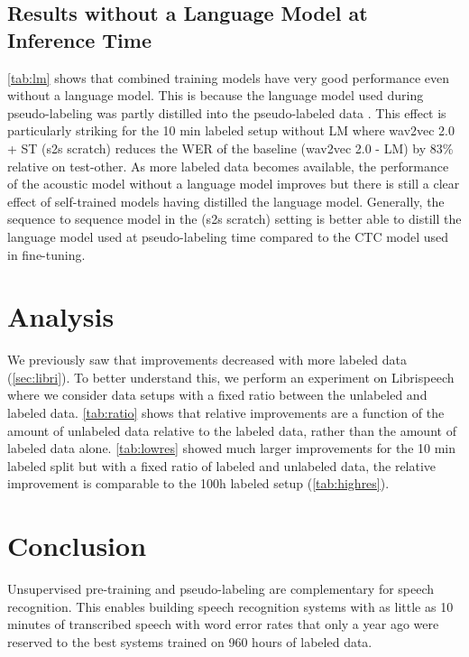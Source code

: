 \documentclass{article}
\newcommand{\wvpp}{wav2vec 2.0}
\newcommand{\libri}{Librispeech}
\begin{document}
\subsection{Results without a Language Model at Inference Time}

\autoref{tab:lm} shows that combined training models have very good performance even without a language model.
This is because the language model used during pseudo-labeling was partly distilled into the pseudo-labeled data \cite{synnaeve2019end}.
This effect is particularly striking for the 10 min labeled setup without LM where \wvpp{} + ST (s2s scratch) reduces the WER of the baseline (\wvpp{} - LM) by 83\% relative on test-other.
As more labeled data becomes available, the performance of the acoustic model without a language model improves but there is still a clear effect of self-trained models having distilled the language model.
Generally, the sequence to sequence model in the (s2s scratch) setting is better able to distill the language model used at pseudo-labeling time compared to the CTC model used in fine-tuning.





\section{Analysis}
\label{sec:analysis}


We previously saw that improvements decreased with more labeled data (\autoref{sec:libri}).
To better understand this, we perform an experiment on \libri{} where we consider data setups with a fixed ratio between the unlabeled and labeled data.
\autoref{tab:ratio} shows that relative improvements are a function of the amount of unlabeled data relative to the labeled data, rather than the amount of labeled data alone.
\autoref{tab:lowres} showed much larger improvements for the 10 min labeled split but with a fixed ratio of labeled and unlabeled data, the relative improvement is comparable to the 100h labeled setup (\autoref{tab:highres}).





\section{Conclusion}

Unsupervised pre-training and pseudo-labeling are complementary for speech recognition.
This enables building speech recognition systems with as little as 10 minutes of transcribed speech with word error rates that only a year ago were reserved to the best systems trained on 960 hours of labeled data.



\end{document}
